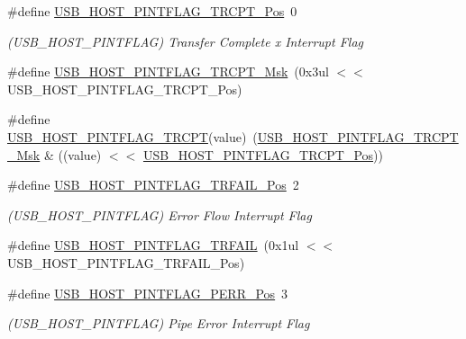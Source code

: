 \begin{DoxyCompactItemize}
\item 
\#define \mbox{\hyperlink{group___s_a_m_d21___u_s_b_ga6100840c1a4b0a3dcc08c85f542d28da}{U\+S\+B\+\_\+\+H\+O\+S\+T\+\_\+\+P\+I\+N\+T\+F\+L\+A\+G\+\_\+\+T\+R\+C\+P\+T\+\_\+\+Pos}}~0
\begin{DoxyCompactList}\small\item\em (U\+S\+B\+\_\+\+H\+O\+S\+T\+\_\+\+P\+I\+N\+T\+F\+L\+AG) Transfer Complete x Interrupt Flag \end{DoxyCompactList}\item 
\#define \mbox{\hyperlink{group___s_a_m_d21___u_s_b_ga6e6aafb86d0093fe19afe79d11a9e17b}{U\+S\+B\+\_\+\+H\+O\+S\+T\+\_\+\+P\+I\+N\+T\+F\+L\+A\+G\+\_\+\+T\+R\+C\+P\+T\+\_\+\+Msk}}~(0x3ul $<$$<$ U\+S\+B\+\_\+\+H\+O\+S\+T\+\_\+\+P\+I\+N\+T\+F\+L\+A\+G\+\_\+\+T\+R\+C\+P\+T\+\_\+\+Pos)
\item 
\#define \mbox{\hyperlink{group___s_a_m_d21___u_s_b_ga90a8ebc6c8a4eb5a4d968f9ed074ddfb}{U\+S\+B\+\_\+\+H\+O\+S\+T\+\_\+\+P\+I\+N\+T\+F\+L\+A\+G\+\_\+\+T\+R\+C\+PT}}(value)~(\mbox{\hyperlink{group___s_a_m_d21___u_s_b_ga6e6aafb86d0093fe19afe79d11a9e17b}{U\+S\+B\+\_\+\+H\+O\+S\+T\+\_\+\+P\+I\+N\+T\+F\+L\+A\+G\+\_\+\+T\+R\+C\+P\+T\+\_\+\+Msk}} \& ((value) $<$$<$ \mbox{\hyperlink{group___s_a_m_d21___u_s_b_ga6100840c1a4b0a3dcc08c85f542d28da}{U\+S\+B\+\_\+\+H\+O\+S\+T\+\_\+\+P\+I\+N\+T\+F\+L\+A\+G\+\_\+\+T\+R\+C\+P\+T\+\_\+\+Pos}}))
\item 
\#define \mbox{\hyperlink{group___s_a_m_d21___u_s_b_gaa2c544cfb41c4bfd57fc26c82846caac}{U\+S\+B\+\_\+\+H\+O\+S\+T\+\_\+\+P\+I\+N\+T\+F\+L\+A\+G\+\_\+\+T\+R\+F\+A\+I\+L\+\_\+\+Pos}}~2
\begin{DoxyCompactList}\small\item\em (U\+S\+B\+\_\+\+H\+O\+S\+T\+\_\+\+P\+I\+N\+T\+F\+L\+AG) Error Flow Interrupt Flag \end{DoxyCompactList}\item 
\#define \mbox{\hyperlink{group___s_a_m_d21___u_s_b_gaf7367a21e790dc72b9a2e5ab779fdbff}{U\+S\+B\+\_\+\+H\+O\+S\+T\+\_\+\+P\+I\+N\+T\+F\+L\+A\+G\+\_\+\+T\+R\+F\+A\+IL}}~(0x1ul $<$$<$ U\+S\+B\+\_\+\+H\+O\+S\+T\+\_\+\+P\+I\+N\+T\+F\+L\+A\+G\+\_\+\+T\+R\+F\+A\+I\+L\+\_\+\+Pos)
\item 
\#define \mbox{\hyperlink{group___s_a_m_d21___u_s_b_gaf055ccba171a0d300e17e975a13a44fe}{U\+S\+B\+\_\+\+H\+O\+S\+T\+\_\+\+P\+I\+N\+T\+F\+L\+A\+G\+\_\+\+P\+E\+R\+R\+\_\+\+Pos}}~3
\begin{DoxyCompactList}\small\item\em (U\+S\+B\+\_\+\+H\+O\+S\+T\+\_\+\+P\+I\+N\+T\+F\+L\+AG) Pipe Error Interrupt Flag \end{DoxyCompactList}\item 
$$
\end{DoxyCompactItemize}
